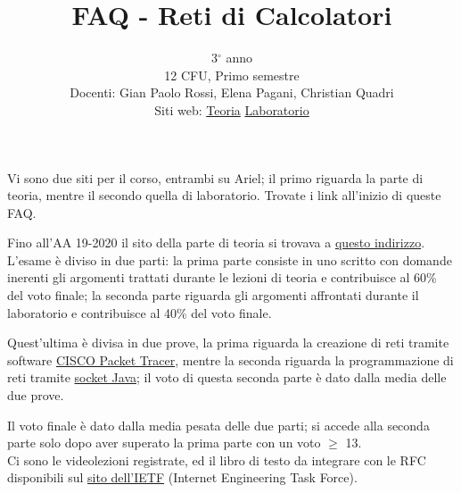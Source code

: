 \documentclass{article}
\title{FAQ - \textbf{Reti di Calcolatori}}
\author{
	3$^{\circ}$ anno\\12 CFU, Primo semestre\\
	Docenti: Gian Paolo Rossi, Elena Pagani, Christian Quadri\\ 
	Siti web:
	\href{https://grossircc.ariel.ctu.unimi.it/v5/frm3/ThreadList.aspx?name=contenuti}{Teoria}
	\href{https://epaganircl.ariel.ctu.unimi.it/v5/frm3/ThreadList.aspx?name=contenuti}{Laboratorio}
	\date{}
}
\begin{document}
 
	\maketitle
	
	\begin{enumerate}
		
		\rmfamily
		Vi sono due siti per il corso, entrambi su Ariel; il primo riguarda la parte di teoria, mentre il secondo quella di laboratorio. Trovate i link all'inizio di queste FAQ.
		
		Fino all'AA 19-2020 il sito della parte di teoria si trovava a \href{http://old.nptlab.di.unimi.it/index.php/reti-di-calcolatori.html}{questo indirizzo}. \\
		
		L'esame è diviso in due parti: la prima parte consiste in uno scritto con domande inerenti gli argomenti trattati durante le lezioni di teoria e contribuisce al 60\% del voto finale; la seconda parte riguarda gli argomenti affrontati durante il laboratorio e contribuisce al 40\% del voto finale.
		
		Quest'ultima è divisa in due prove, la prima riguarda la creazione di reti tramite software \href{https://en.wikipedia.org/wiki/Packet_Tracer}{CISCO Packet Tracer}, mentre la seconda riguarda la programmazione di reti tramite \href{https://docs.oracle.com/javase/8/docs/api/index.html?java/net/Socket.html}{socket Java}; il voto di questa seconda parte è dato dalla media delle due prove.
		
		Il voto finale è dato dalla media pesata delle due parti; si accede alla seconda parte solo dopo aver superato la prima parte con un voto $\geq$ 13. \\
		
		Ci sono le videolezioni registrate, ed il libro di testo da integrare con le RFC disponibili sul \href{https://ietf.org/standards/rfcs/}{sito dell'IETF} (Internet Engineering Task Force).
		
	\end{enumerate}
	
\end{document}
